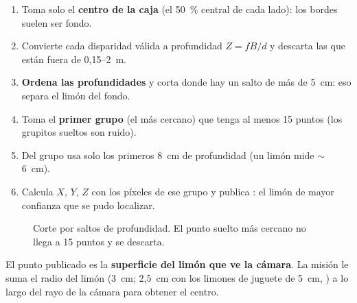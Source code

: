 \begin{enumerate}
  \item Toma solo el \textbf{centro de la caja} (el 50~\% central de cada lado): los bordes suelen ser fondo.
  \item Convierte cada disparidad válida a profundidad $Z = fB/d$ y descarta las que están fuera de 0,15--2~m.
  \item \textbf{Ordena las profundidades} y corta donde hay un salto de más de 5~cm: eso separa el limón del fondo.
  \item Toma el \textbf{primer grupo} (el más cercano) que tenga al menos 15 puntos (los grupitos sueltos son ruido).
  \item Del grupo usa solo los primeros 8~cm de profundidad (un limón mide $\sim$6~cm).
  \item Calcula $X$, $Y$, $Z$ con los píxeles de ese grupo y publica : el limón de mayor
        confianza que se pudo localizar.
\end{enumerate}

\begin{figure}[H]
\centering
{}
\caption{Corte por saltos de profundidad. El punto suelto más cercano no llega a 15 puntos y se descarta.}
\end{figure}

\begin{nota}
El punto publicado es la \textbf{superficie del limón que ve la cámara}. La misión le suma el radio del limón (3~cm;
2,5~cm con los limones de juguete de 5~cm, ) a lo largo del rayo de la cámara para obtener el centro.
\end{nota}

